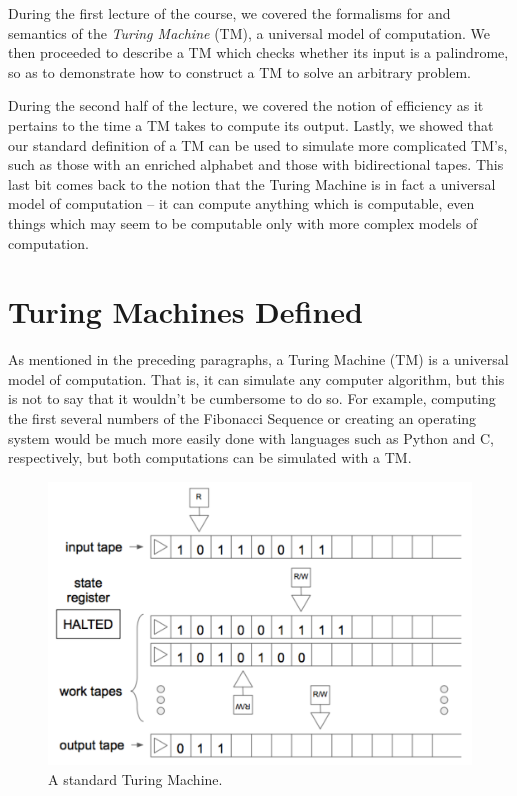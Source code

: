 \documentclass[usletter]{article}
\begin{document}

\noindent
During the first lecture of the course, we covered the formalisms for and semantics of the \emph{Turing Machine} (TM), a universal model of computation. We then proceeded to describe a TM which checks whether its input is a palindrome, so as to demonstrate how to construct a TM to solve an arbitrary problem.

During the second half of the lecture, we covered the notion of efficiency as it pertains to the time a TM takes to compute its output. Lastly, we showed that our standard definition of a TM can be used to simulate more complicated TM's, such as those with an enriched alphabet and those with bidirectional tapes. This last bit comes back to the notion that the Turing Machine is in fact a universal model of computation -- it can compute anything which is computable, even things which may seem to be computable only with more complex models of computation.

\section{Turing Machines Defined}

As mentioned in the preceding paragraphs, a Turing Machine (TM) is a universal model of computation. That is, it can simulate any computer algorithm, but this is not to say that it wouldn't be cumbersome to do so. For example, computing the first several numbers of the Fibonacci Sequence or creating an operating system would be much more easily done with languages such as Python and C, respectively, but both computations can be simulated with a TM. 

\begin{figure}[h!]
\begin{center}
\includegraphics[width=\textwidth]{tm}
\end{center}
\caption{A standard Turing Machine.}
\label{fig:tm}
\end{figure}
\end{document}
